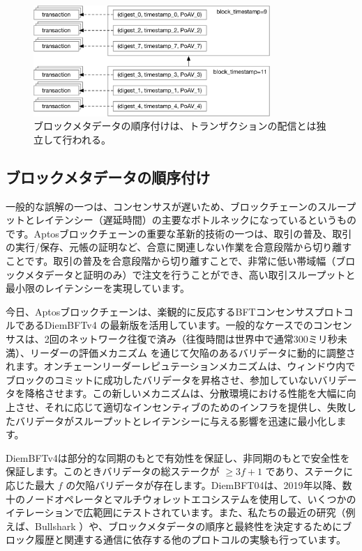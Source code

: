 \documentclass{article}
\begin{document}
\begin{figure}
\centering
\includegraphics[width=0.8\textwidth]{ordering.pdf}
\caption{\label{fig:block}ブロックメタデータの順序付けは、トランザクションの配信とは独立して行われる。}
\end{figure}

\subsection{ブロックメタデータの順序付け}
\label{subsec:block_metadata_ordering}

一般的な誤解の一つは、コンセンサスが遅いため、ブロックチェーンのスループットとレイテンシー（遅延時間）の主要なボトルネックになっているというものです。Aptosブロックチェーンの重要な革新的技術の一つは、取引の普及、取引の実行/保存、元帳の証明など、合意に関連しない作業を合意段階から切り離すことです。取引の普及を合意段階から切り離すことで、非常に低い帯域幅（ブロックメタデータと証明のみ）で注文を行うことができ、高い取引スループットと最小限のレイテンシーを実現しています。

今日、Aptosブロックチェーンは、楽観的に反応するBFTコンセンサスプロトコルであるDiemBFTv4 \cite{diembft_v4}の最新版を活用しています。一般的なケースでのコンセンサスは、2回のネットワーク往復で済み（往復時間は世界中で通常300ミリ秒未満）、リーダーの評価メカニズム \cite{be_aware}を通じて欠陥のあるバリデータに動的に調整されます。オンチェーンリーダーレピュテーションメカニズムは、ウィンドウ内でブロックのコミットに成功したバリデータを昇格させ、参加していないバリデータを降格させます。この新しいメカニズムは、分散環境における性能を大幅に向上させ、それに応じて適切なインセンティブのためのインフラを提供し、失敗したバリデータがスループットとレイテンシーに与える影響を迅速に最小化します。

DiemBFTv4は部分的な同期のもとで有効性を保証し、非同期のもとで安全性を保証します。このときバリデータの総ステークが $\geq 3f+1$ であり、ステークに応じた最大 $f$ の欠陥バリデータが存在します。DiemBFT04は、2019年以降、数十のノードオペレータとマルチウォレットエコシステムを使用して、いくつかのイテレーションで広範囲にテストされています。また、私たちの最近の研究（例えば、Bullshark \cite{bullshark}）や、ブロックメタデータの順序と最終性を決定するためにブロック履歴と関連する通信に依存する他のプロトコルの実験も行っています。
\end{document}
